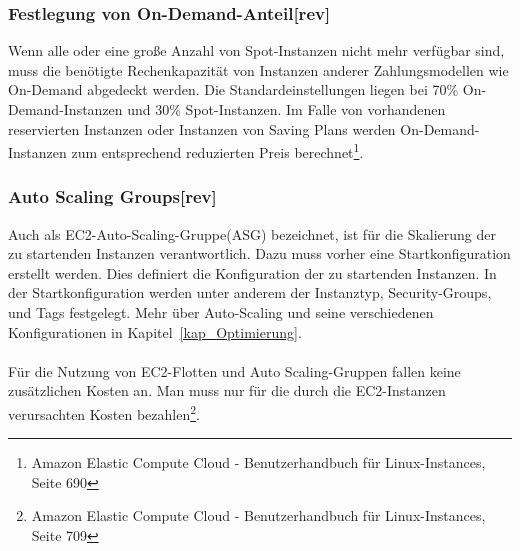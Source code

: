 \subsubsection*{Festlegung von On-Demand-Anteil[rev]}
Wenn alle oder eine große Anzahl von Spot-Instanzen nicht mehr verfügbar sind, muss die benötigte Rechenkapazität von Instanzen anderer Zahlungsmodellen wie On-Demand abgedeckt werden. Die Standardeinstellungen liegen bei 70\% On-Demand-Instanzen und 30\% Spot-Instanzen\cite{AMZ24}. Im Falle von vorhandenen reservierten Instanzen oder Instanzen von Saving Plans werden On-Demand-Instanzen zum entsprechend reduzierten Preis berechnet\footnote{\cite{AMZ26} Amazon Elastic Compute Cloud - Benutzerhandbuch für Linux-Instances, Seite 690}.

\subsubsection*{Auto Scaling Groups[rev]}
Auch als EC2-Auto-Scaling-Gruppe(ASG) bezeichnet, ist für die Skalierung der zu startenden Instanzen verantwortlich. Dazu muss vorher eine Startkonfiguration  erstellt werden. Dies definiert die Konfiguration der zu startenden Instanzen. In der Startkonfiguration werden unter anderem der Instanztyp, Security-Groups, und Tags festgelegt. Mehr über Auto-Scaling und seine verschiedenen Konfigurationen in Kapitel~\ref{kap_Optimierung}.
\\\\
Für die Nutzung von EC2-Flotten und Auto Scaling-Gruppen fallen keine zusätzlichen Kosten an. Man muss nur für die durch die EC2-Instanzen verursachten Kosten bezahlen\footnote{\cite{AMZ26} Amazon Elastic Compute Cloud - Benutzerhandbuch für Linux-Instances, Seite 709}. 

